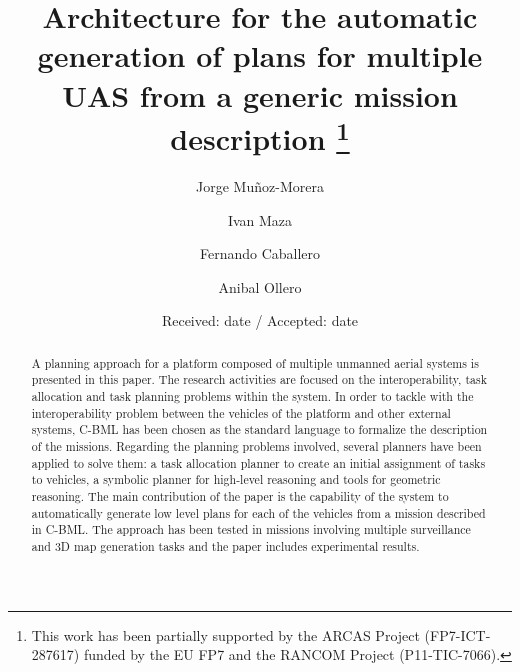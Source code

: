 \documentclass[twocolumn]{svjour3}          %
\begin{document}

\title{Architecture for the automatic generation of plans for multiple UAS from a generic mission description  
\thanks{This work has been partially supported by the ARCAS Project (FP7-ICT-287617) funded by the EU FP7 and the RANCOM Project (P11-TIC-7066).}}


\author{Jorge Mu\~{n}oz-Morera        \and
        Ivan Maza \and
        Fernando Caballero \and
        Anibal Ollero
}



\date{Received: date / Accepted: date}

\maketitle

\begin{abstract}
A planning approach for a platform composed of multiple unmanned aerial systems is presented in this paper. The research activities are focused on the interoperability, task allocation 
and task planning problems within the system. In order to tackle with the interoperability problem between the vehicles of the platform and other external systems, C-BML has been chosen as the standard language to formalize the description of the missions. Regarding the planning problems involved, several planners have been applied to solve them: a task allocation planner to create an initial assignment of tasks to vehicles, a symbolic planner for high-level reasoning and tools for geometric reasoning. The main contribution of the paper is the capability of the system to automatically generate low level plans for each of the vehicles from a mission described in C-BML. The approach has been tested in missions involving multiple surveillance and 3D map generation tasks and the paper includes experimental results.   


\end{abstract}
\end{document}
